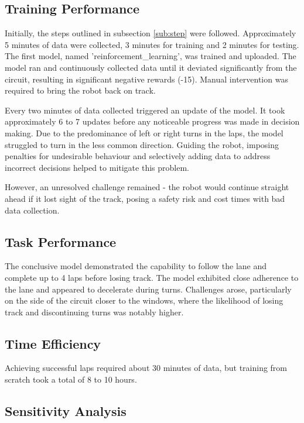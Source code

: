 \documentclass[12pt]{report}
\begin{document}
\subsection{Training Performance}

Initially, the steps outlined in subsection \ref{sub:step} were followed. Approximately 5 minutes of data were collected, 3 minutes for training and 2 minutes for testing. The first model, named 'reinforcement\_learning', was trained and uploaded. The model ran and continuously collected data until it deviated significantly from the circuit, resulting in significant negative rewards (-15). Manual intervention was required to bring the robot back on track.

Every two minutes of data collected triggered an update of the model. It took approximately 6 to 7 updates before any noticeable progress was made in decision making. Due to the predominance of left or right turns in the laps, the model struggled to turn in the less common direction. Guiding the robot, imposing penalties for undesirable behaviour and selectively adding data to address incorrect decisions helped to mitigate this problem.

However, an unresolved challenge remained - the robot would continue straight ahead if it lost sight of the track, posing a safety risk and cost times with bad data collection. 

\subsection{Task Performance}

The conclusive model demonstrated the capability to follow the lane and complete up to 4 laps before losing track. The model exhibited close adherence to the lane and appeared to decelerate during turns. Challenges arose, particularly on the side of the circuit closer to the windows, where the likelihood of losing track and discontinuing turns was notably higher.

\subsection{Time Efficiency}

Achieving successful laps required about 30 minutes of data, but training from scratch took a total of 8 to 10 hours. 

\subsection{Sensitivity Analysis}
\end{document}
